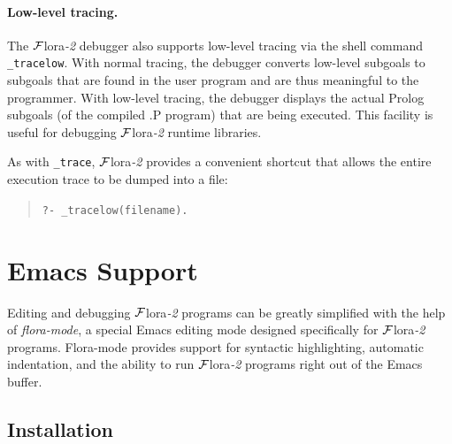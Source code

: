 \documentclass[11pt]{article}
\newcommand{\FLORA}{{\mbox{\sc ${\cal F}${lora}\rm\emph{-2}}}\xspace}
\begin{document}
\paragraph{Low-level tracing.}
The \FLORA debugger also supports low-level tracing via the shell command {\tt
  \_tracelow}. With normal tracing, the debugger converts low-level
subgoals to subgoals that are found in the user program and are thus
meaningful to the programmer. With low-level tracing, the debugger displays
the actual Prolog subgoals (of the compiled .P program) that are being
executed. This facility is useful for debugging \FLORA runtime libraries.

As with {\tt \_trace}, \FLORA provides a convenient shortcut that allows
the entire execution trace to be dumped into a file:
\begin{quote}
 \tt     ?- \_tracelow(filename).  
\end{quote}



\newpage
\section{Emacs Support}

Editing and debugging \FLORA programs can be greatly simplified with the
help of \emph{flora-mode}, a special Emacs editing mode designed
specifically for \FLORA programs. Flora-mode provides support for syntactic
highlighting, automatic indentation, and the ability to run \FLORA programs
right out of the Emacs buffer.


\subsection{Installation}
\end{document}
